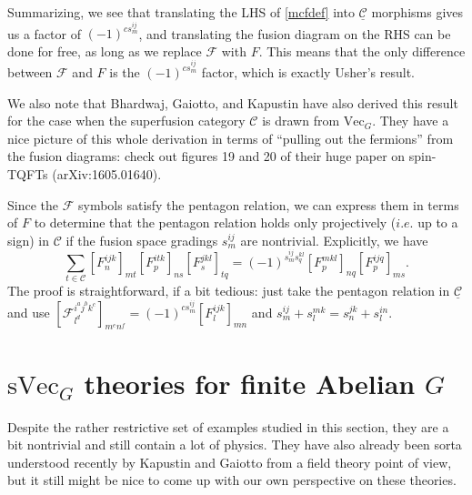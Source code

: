 \documentclass[12pt,a4paper]{article}
\newcommand{\ulmcc}{\underline{\mathcal{C}}}
\newcommand\be            {\begin{equation}}
\newcommand\ee            {\end{equation}}
\newcommand{\mcf}{\mathcal{F}}
\newcommand{\mcc}{\mathcal{C}}
\newcommand{\vect}{\text{Vec}}
\newcommand{\svect}{\text{sVec}}
\begin{document}
Summarizing, we see that translating the LHS of \eqref{mcfdef} into $\ulmcc$ morphisms gives us a factor of $(-1)^{cs^{ij}_m}$, and translating the fusion diagram on the RHS can be done for free, as long as we replace $\mcf$ with $F$. This means that the only difference between $\mcf$ and $F$ is the $(-1)^{cs^{ij}_m}$ factor, which is exactly Usher's result. 

We also note that Bhardwaj, Gaiotto, and Kapustin have also derived this result for the case when the superfusion category $\mcc$ is drawn from $\vect_G$. They have a nice picture of this whole derivation in terms of ``pulling out the fermions'' from the fusion diagrams: check out figures 19 and 20 of their huge paper on spin-TQFTs (arXiv:1605.01640). 

Since the $\mcf$ symbols satisfy the pentagon relation, we can express them in terms of $F$ to determine that the pentagon relation holds only projectively ($i.e.$ up to a sign) in $\mcc$ if the fusion space gradings $s^{ij}_m$ are nontrivial. Explicitly, we have 
\be \sum_{t\in \mcc} [F^{ijk}_n]_{mt} [F^{itk}_p]_{ns} [F^{jkl}_s]_{tq} = (-1)^{s^{ij}_m s^{kl}_q} [F^{mkl}_p]_{nq} [F^{ijq}_p]_{ms}.\ee
The proof is straightforward, if a bit tedious: just take the pentagon relation in $\ulmcc$ and use $[\mcf^{i^aj^bk^c}_{l^d}]_{m^en^f} = (-1)^{cs^{ij}_m}[F^{ijk}_l]_{mn}$ and $s^{ij}_m + s^{mk}_l = s^{jk}_n + s^{in}_l.$



\section{$\svect_G$ theories for finite Abelian $G$}

Despite the rather restrictive set of examples studied in this section, they are a bit nontrivial and still contain a lot of physics. They have also already been sorta understood recently by Kapustin and Gaiotto from a field theory point of view, but it still might be nice to come up with our own perspective on these theories. 
\end{document}
